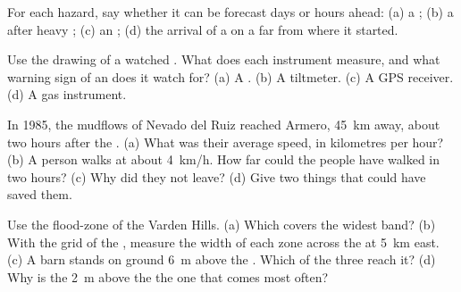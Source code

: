\begin{exercise}[$\star$]\label{exo:g9:natural-risks:3}
For each hazard, say whether it can be forecast days or hours ahead:
(a) a ; (b) a  after heavy ; (c) an ; (d) the
arrival of a  on a  far from where it started.
\end{exercise}

\begin{exercise}[$\star$]\label{exo:g9:natural-risks:4}
Use the drawing of a watched . What does each instrument measure,
and what warning sign of an  does it watch for? (a) A .
(b) A tiltmeter. (c) A GPS receiver. (d) A gas instrument.
\end{exercise}

\begin{exercise}[$\star\star$]\label{exo:g9:natural-risks:5}
In 1985, the mudflows of Nevado del Ruiz reached Armero, \qty{45}{km}
away, about two hours after the . (a) What was their average
speed, in kilometres per hour? (b) A person walks at about
\qty{4}{km/h}. How far could the people have walked in two hours?
(c) Why did they not leave? (d) Give two things that could have saved
them.
\end{exercise}

\begin{exercise}[$\star\star$]\label{exo:g9:natural-risks:6}
Use the flood-zone  of the Varden Hills. (a) Which  covers the
widest band? (b) With the grid of the , measure the width of each
zone across the  at \qty{5}{km} east. (c) A barn stands on ground
\qty{6}{m} above the .
Which of the three  reach it? (d) Why is the  \qty{2}{m} above
the  the one that comes most often?
\end{exercise}

